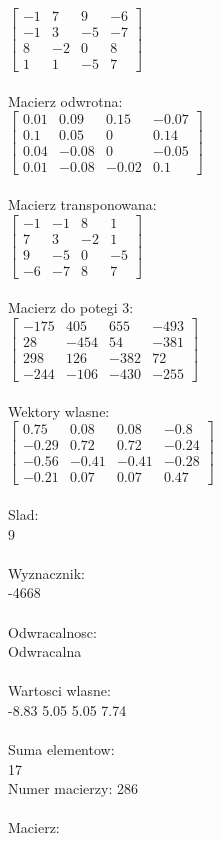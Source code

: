 \documentclass[a4paper,12pt]{article}
\begin{document}
$\begin{bmatrix} -1&7&9&-6\\-1&3&-5&-7\\8&-2&0&8\\1&1&-5&7 \end{bmatrix}$
\\
\\
Macierz odwrotna:\\

$\begin{bmatrix} 0.01&0.09&0.15&-0.07\\0.1&0.05&0&0.14\\0.04&-0.08&0&-0.05\\0.01&-0.08&-0.02&0.1 \end{bmatrix}$
\\
\\
Macierz transponowana:\\

$\begin{bmatrix} -1&-1&8&1\\7&3&-2&1\\9&-5&0&-5\\-6&-7&8&7 \end{bmatrix}$
\\
\\
Macierz do potegi 3:\\

$\begin{bmatrix} -175&405&655&-493\\28&-454&54&-381\\298&126&-382&72\\-244&-106&-430&-255 \end{bmatrix}$
\\
\\
Wektory wlasne:\\

$\begin{bmatrix} 0.75&0.08&0.08&-0.8\\-0.29&0.72&0.72&-0.24\\-0.56&-0.41&-0.41&-0.28\\-0.21&0.07&0.07&0.47 \end{bmatrix}$
\\
\\
Slad:\\
9
\\
\\
Wyznacznik:\\
-4668
\\
\\
Odwracalnosc:\\
Odwracalna
\\
\\
Wartosci wlasne:\\
-8.83 5.05 5.05 7.74
\\
\\
Suma elementow:\\
17
\\
\newpage
Numer macierzy:
286
\\
\\
Macierz:\\
\end{document}
